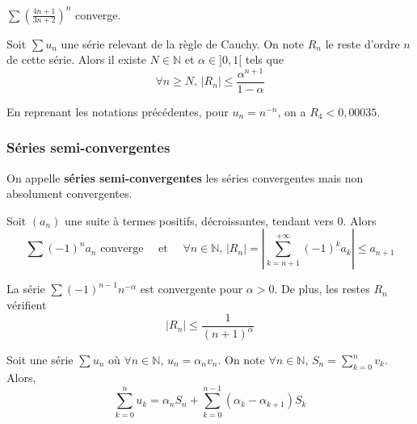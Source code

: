 	\begin{example}
		$\sum \left( \frac{4n+1}{3n+2} \right)^{n}$ converge.
	\end{example}
	
	
	\begin{proposition}
		Soit $\sum u_n$ une série relevant de la règle de Cauchy. On note $R_n$ le reste d'ordre $n$ de cette série. Alors il existe $N \in \mathbb{N}$ et $\alpha \in ]0,1[$ tels que
		\[ \forall n \geq N, \, |R_n| \leq \frac{\alpha^{n+1}}{1-\alpha} \]
	\end{proposition}
	
	\begin{example}
		En reprenant les notations précédentes, pour $u_n = n^{-n}$, on a $R_4 < 0,00035$.
	\end{example}
	
	\subsubsection{Séries semi-convergentes}
	
	
	\begin{definition}
		On appelle \textbf{séries semi-convergentes} les séries convergentes mais non absolument convergentes.
	\end{definition}
	
	\begin{theorem}
		Soit $(a_n)$ une suite à termes positifs, décroissantes, tendant vers $0$. Alors
		\[ \sum (-1)^n a_n \text{ converge} \quad \text{ et } \quad \forall n \in \mathbb{N}, \, |R_n| = \left| \sum_{k=n+1}^{+\infty} (-1)^k a_k \right| \leq a_{n+1} \]
	\end{theorem}
	
	
	\begin{example}
		La série $\sum (-1)^{n-1} n^{-\alpha}$ est convergente pour $\alpha > 0$. De plus, les restes $R_n$ vérifient
		\[ |R_n| \leq \frac{1}{(n+1)^\alpha} \]
	\end{example}
	
	
	\begin{proposition}
		Soit une série $\sum u_n$ où $\forall n \in \mathbb{N}, \, u_n = \alpha_n v_n$. On note $\forall n \in \mathbb{N}, \, S_n = \sum_{k=0}^n v_k$. Alors,
		\[ \sum_{k=0}^n u_k = \alpha_n S_n + \sum_{k=0}^{n-1} (\alpha_k - \alpha_{k+1}) S_k \]
	\end{proposition}
	
